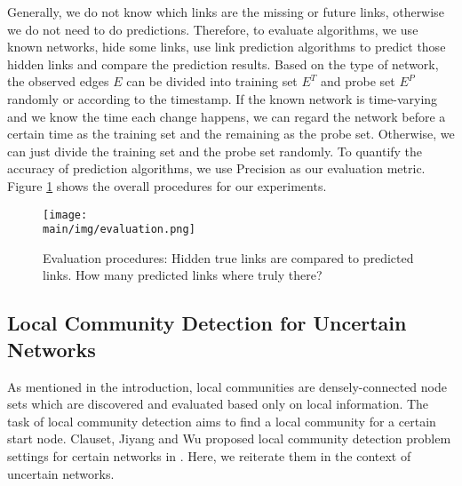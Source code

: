 \documentclass[\main/thesis.tex]{subfiles}
\begin{document}
Generally, we do not know which links are the missing or future links, otherwise we do not need to do predictions. Therefore, to evaluate algorithms, we use known networks, hide some links, use link prediction algorithms to predict those hidden links and compare the prediction results. Based on the type of network, the observed edges $E$ can be divided into training set $E^T$ and probe set $E^P$ randomly or according to the timestamp. If the known network is time-varying and we know the time each change happens, we can regard the network before a certain time as the training set and the remaining as the probe set. Otherwise, we can just divide the training set and the probe set randomly. To quantify the accuracy of prediction algorithms, we use Precision as our evaluation metric. Figure \ref{link-Evaluation-procedures} shows the overall procedures for our experiments. 
\begin{figure}
\centering
\texttt{[image: \\main/img/evaluation.png]}
\caption{Evaluation procedures: Hidden true links are compared to predicted links. How many predicted links where truly there?}
\label{link-Evaluation-procedures}
\end{figure}


\subsection{Local Community Detection for Uncertain Networks}
As mentioned in the introduction, local communities are densely-connected node sets which are discovered and evaluated based only on local information. The task of local community detection aims to find a local community for a certain start node. Clauset, Jiyang and Wu proposed local community detection problem settings for certain networks in \cite{clauset2005finding,chen2009detecting,wu2012local}. Here, we reiterate them in the context of uncertain networks.
\end{document}
